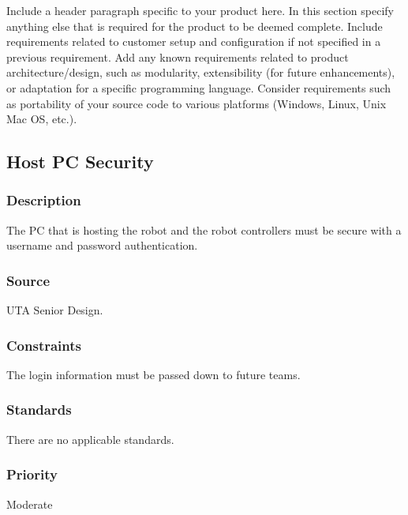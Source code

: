 Include a header paragraph specific to your product here. In this section specify anything else that is required for the product to be deemed complete. Include requirements related to customer setup and configuration if not specified in a previous requirement. Add any known requirements related to product architecture/design, such as modularity, extensibility (for future enhancements), or adaptation for a specific programming language. Consider requirements such as portability of your source code to various platforms (Windows, Linux, Unix Mac OS, etc.).

\subsection{Host PC Security}
\subsubsection{Description}
The PC that is hosting the robot and the robot controllers must be secure with a username and password authentication.\subsubsection{Source}
UTA Senior Design.
\subsubsection{Constraints}
The login information must be passed down to future teams.
\subsubsection{Standards}
There are no applicable standards.
\subsubsection{Priority}
Moderate